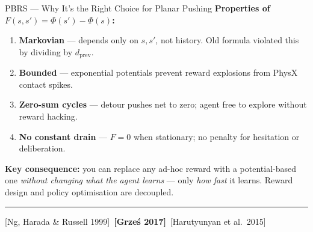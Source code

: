\documentclass[aspectratio=169,xcolor=dvipsnames,t]{beamer}
\newcommand{\litfooter}[1]{%
  \vspace{2pt}%
  \hrule%
  \vspace{2pt}%
  {\tiny\color{LightDarkGrey} #1}%
}
\begin{document}
\begin{frame}[t]{PBRS — Why It's the Right Choice for Planar Pushing}
  \textbf{Properties of $F(s,s') = \Phi(s') - \Phi(s)$:}
  \begin{enumerate}
    \item \textbf{Markovian} — depends only on $s,s'$, not history. Old formula violated this by dividing by $d_{\text{prev}}$.
    \item \textbf{Bounded} — exponential potentials prevent reward explosions from PhysX contact spikes.
    \item \textbf{Zero-sum cycles} — detour pushes net to zero; agent free to explore without reward hacking.
    \item \textbf{No constant drain} — $F{=}0$ when stationary; no penalty for hesitation or deliberation.
  \end{enumerate}

  \vspace{4pt}
  \textbf{Key consequence:} you can replace any ad-hoc reward with a potential-based one \emph{without changing what the agent learns} — only \emph{how fast} it learns. Reward design and policy optimisation are decoupled.

  \vfill\litfooter{[Ng, Harada \& Russell 1999]~\textbf{[Grze\'s 2017]}~[Harutyunyan et al.\ 2015]}
\end{frame}

\end{document}

